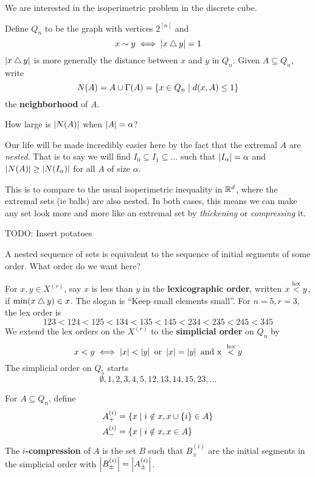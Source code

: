 \documentclass{article}
\begin{document}
We are interested in the isoperimetric problem in the discrete cube.

Define $Q_n$ to be the graph with vertices $2^{[n]}$ and
$$x \sim y \iff \left\lvert x \mathbin\varbigtriangleup y\right\rvert = 1$$
$\left\lvert x \mathbin\varbigtriangleup y\right\rvert$ is more generally the distance between $x$ and $y$ in $Q_n$. Given $A \subseteq Q_n$, write
$$N(A) = A \cup \Gamma(A) = \{x \in Q_n \mid d(x, A) \le 1\}$$
the {\bf neighborhood} of $A$.

\begin{question}
  How large is $\left\lvert N(A)\right\rvert$ when $\left\lvert A\right\rvert = \alpha$?
\end{question}

Our life will be made incredibly easier here by the fact that the extremal $A$ are {\it nested}. That is to say we will find $I_0 \subseteq I_1 \subseteq \dots$ such that $\left\lvert I_\alpha\right\rvert = \alpha$ and $\left\lvert N(A)\right\rvert \ge \left\lvert N(I_\alpha)\right\rvert$ for all $A$ of size $\alpha$.

This is to compare to the usual isoperimetric inequality in $\mathbb R^d$, where the extremal sets (ie balls) are also nested. In both cases, this means we can make any set look more and more like an extremal set by {\it thickening} or {\it compressing} it.

TODO: Insert potatoes

\newlec

A nested sequence of sets is equivalent to the sequence of initial segments of some order. What order do we want here?

For $x, y \in X^{(r)}$, say $x$ is less than $y$ in the {\bf lexicographic order}, written $x \overset{\text{lex}}< y$, if $\min(x \mathbin\varbigtriangleup y) \in x$. The slogan is ``Keep small elements small''. For $n = 5, r = 3$, the lex order is
$$123 < 124 < 125 < 134 < 135 < 145 < 234 < 235 < 245 < 345$$
We extend the lex orders on the $X^{(r)}$ to the {\bf simplicial order} on $Q_n$ by
$$x < y \iff \left\lvert x\right\rvert < \left\lvert y\right\rvert \text{ or } \left\lvert x\right\rvert = \left\lvert y\right\rvert \text{ and x } \overset{\text{lex}}< y$$
The simplicial order on $Q_5$ starts
$$\emptyset, 1, 2, 3, 4, 5, 12, 13, 14, 15, 23, \dots$$

\begin{defi}
  For $A \subseteq Q_n$, define
  \begin{align*}
    A_+^{(i)} & = \{x \mid i \notin x, x \cup \{i\} \in A\} \\
    A_-^{(i)} & = \{x \mid i \notin x, x \in A\}
  \end{align*}
  The {\bf $i$-compression} of $A$ is the set $B$ such that $B_\pm^{(i)}$ are the initial segments in the simplicial order with $\left\lvert B_\pm^{(i)}\right\rvert = \left\lvert A_\pm^{(i)}\right\rvert$.
\end{defi}
\end{document}
